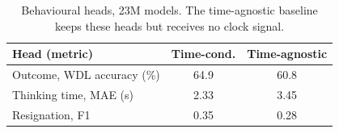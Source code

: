 \begin{table}[t]
\caption{Behavioural heads, 23M models. The time-agnostic baseline keeps these heads but receives no clock signal.}
\label{tab:aux}
\centering
\renewcommand{\arraystretch}{1.2}
\begin{tabular}{lcc}
\hline
\textbf{Head (metric)} & \textbf{Time-cond.} & \textbf{Time-agnostic} \\
\hline
Outcome, WDL accuracy (\%) & 64.9 & 60.8 \\
Thinking time, MAE (s)     & 2.33 & 3.45 \\
Resignation, F1            & 0.35 & 0.28 \\
\hline
\end{tabular}
\end{table}
